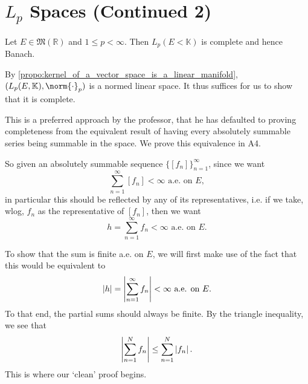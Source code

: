 \documentclass[notoc,notitlepage]{tufte-book}
\begin{document}
\section{\texorpdfstring{$L_p$}{Lp} Spaces (Continued 2)}%
\label{sec:_l_p_spaces_continued_2}

\begin{thm}\label{thm:lp_spaces_are_banach}
  Let $E \in \mathfrak{M}(\mathbb{R})$ and $1 \leq p < \infty$. Then $L_p(E<
  \mathbb{K})$ is complete and hence Banach.
\end{thm}

\begin{strategy}
  By \cref{propo:kernel_of_a_vector_space_is_a_linear_manifold}, $(L_p(E,
  \mathbb{K}), \norm{\cdot}_p)$ is a normed linear space. It thus suffices for
  us to show that it is complete.

  This is a preferred approach by the professor, that he has defaulted to
  proving completeness from the equivalent result of having every absolutely
  summable series being summable in the space. We prove this equivalence in A4.

  So given an absolutely summable sequence $\{ [f_n] \}_{n=1}^{\infty}$, since
  we want
  \begin{equation*}
    \sum_{n=1}^{\infty} [f_n] < \infty \text{ a.e. on } E,
  \end{equation*}
  in particular this should be reflected by any of its representatives, i.e. if
  we take, wlog, $f_n$ as the representative of $[f_n]$, then we want
  \begin{equation*}
    h = \sum_{n=1}^{\infty} f_n < \infty \text{ a.e. on } E.
  \end{equation*}

  To show that the sum is finite a.e. on $E$, we will first make use of the fact
  that this would be equivalent to
  \begin{equation*}
    \left|h\right| = \left| \sum_{n=1}^{\infty} f_n \right| < \infty \text{ a.e. on } E.
  \end{equation*}
  To that end, the partial sums should always be finite. By the triangle
  inequality, we see that
  \begin{equation*}
    \left| \sum_{n=1}^{N} f_n \right| \leq \sum_{n=1}^{N} \left|f_n\right|.
  \end{equation*}
  This is where our `clean' proof begins.
\end{strategy}
\end{document}
